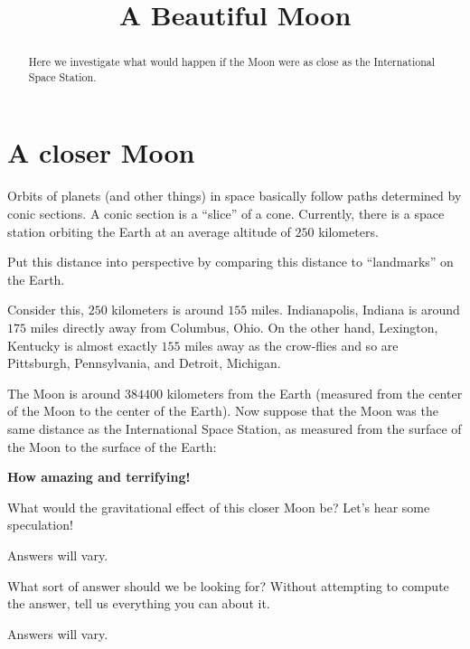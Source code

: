 \documentclass{ximera}
\title{A Beautiful Moon}
\begin{document}
\begin{abstract}
Here we investigate what would happen if the Moon were as close as the
International Space Station.
\end{abstract}
\maketitle

\section{A closer Moon}

Orbits of planets (and other things) in space basically follow paths
determined by conic sections. A conic section is a ``slice'' of a
cone. Currently, there is a space station orbiting the Earth at an average
altitude of $250$ kilometers.

\begin{question}
Put this distance into perspective by comparing this distance to
``landmarks'' on the Earth.
\begin{freeResponse}
Consider this, $250$ kilometers is around $155$ miles. Indianapolis,
Indiana is around $175$ miles directly away from Columbus, Ohio. On
the other hand, Lexington, Kentucky is almost exactly $155$ miles away
as the crow-flies and so are Pittsburgh, Pennsylvania, and Detroit,
Michigan.
\end{freeResponse}
\end{question}

The Moon is around $384400$ kilometers from the Earth (measured from
the center of the Moon to the center of the Earth). Now suppose that
the Moon was the same distance as the International Space Station, as
measured from the surface of the Moon to the surface of the Earth:

\begin{center}
\textbf{How amazing and terrifying!}
\end{center}

\begin{question}
What would the gravitational effect of this closer Moon be? Let's hear
some speculation!
\begin{freeResponse}
Answers will vary. 
\end{freeResponse}
\end{question}

\begin{question}
What sort of answer should we be looking for? Without attempting to
compute the answer, tell us everything you can about it.
\begin{freeResponse}
Answers will vary. 
\end{freeResponse}
\end{question}
\end{document}
